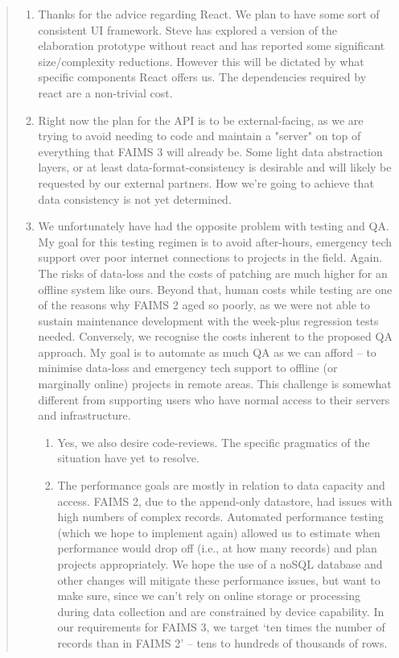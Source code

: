 \documentclass[a4paper,headings=small fontsize=10pt]{scrreprt}
\begin{document}
\begin{quote}
\begin{enumerate}[itemsep=1em]
\item Thanks for the advice regarding React. We plan to have some sort of
  consistent UI framework. Steve has explored a version of the
  elaboration prototype without react and has reported some significant
  size/complexity reductions. However this will be dictated by what
  specific components React offers us. The dependencies required by react
  are a non-trivial cost.
 
\item Right now the plan for the API is to be external-facing, as we
  are trying to avoid needing to code and maintain a "server" on top of
  everything that FAIMS 3 will already be. Some light data abstraction
  layers, or at least data-format-consistency is desirable and
  will likely be requested by our external partners. How we're going to
  achieve that data consistency is not yet determined.
 
\item We unfortunately have had the opposite problem with testing and QA. 
  My goal for this testing regimen is to avoid after-hours, emergency tech 
  support over poor internet connections to projects in the field. Again. 
  The risks of data-loss and the costs of patching are much higher for an 
  offline system like ours. Beyond that, human costs while testing are one 
  of the reasons why FAIMS 2 aged so poorly, as we were not able to sustain 
  maintenance development with the week-plus regression tests needed. 
  Conversely, we recognise the costs inherent to the proposed QA approach. 
  My goal is to automate as much QA as we can afford -- to minimise data-loss and
  emergency tech support to offline (or marginally online) projects in remote areas. 
  This challenge is somewhat different from supporting users who have normal access 
  to their servers and infrastructure.
 

  \begin{enumerate}
  \item Yes, we also desire code-reviews. The specific pragmatics of the
    situation have yet to resolve.
   
  \item The performance goals are mostly in relation to data capacity and
    access. FAIMS 2, due to the append-only datastore, had issues with
    high numbers of complex records. Automated performance testing (which we hope 
    to implement again) allowed us to estimate when performance would drop off 
    (i.e., at how many records) and plan projects appropriately. We hope the use 
    of a noSQL database and other changes 
    will mitigate these performance issues, but want to make sure, since we can't 
    rely on online storage or processing during data collection and are constrained by device capability.
    In our requirements for FAIMS 3, we target `ten times the number of records than in FAIMS 2' 
    -- tens to hundreds of thousands of rows. 
    

\end{enumerate}
\end{enumerate}
\end{quote}
\end{document}
